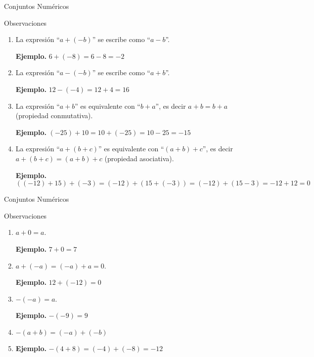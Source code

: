 \documentclass[aspectratio=169,handout,11pt]{beamer}
\begin{document}
	\begin{frame}{Conjuntos Numéricos}
		\begin{block}{Observaciones}
			\begin{enumerate}
				\item La expresión ``$a+(-b)$'' se escribe como ``$a-b$''.
				
				\textbf{Ejemplo.} $6+(-8)=6-8=-2$
				\pause
				
				\item La expresión ``$a-(-b)$'' se escribe como ``$a+b$''.
				
				\textbf{Ejemplo.} $12-(-4)=12+4=16$
				\pause
				
				\item La expresión ``$a+b$'' es equivalente con ``$b+a$'', es decir $a+b=b+a$ (propiedad conmutativa).
				
				\textbf{Ejemplo.} $(-25)+10=10+(-25)=10-25=-15$
				\pause
				
				\item La expresión ``$a+(b+c)$'' es equivalente con ``$(a+b)+c$'', es decir
				$a+(b+c)=(a+b)+c$ (propiedad asociativa).
				
				\textbf{Ejemplo.}
				\[
				((-12)+15)+(-3)=(-12)+(15+(-3))=(-12)+(15-3)=-12+12=0
				\]
			\end{enumerate}
		\end{block}
	\end{frame}
	
	\begin{frame}{Conjuntos Numéricos}
		\begin{block}{Observaciones}
			\begin{enumerate}
				\item $a+0=a$.
				
				\textbf{Ejemplo.} $7+0=7$
				\pause
				
				\item $a+(-a)=(-a)+a=0$.
				
				\textbf{Ejemplo.} $12+(-12)=0$
				\pause
				
				\item $-(-a)=a$.
				
				\textbf{Ejemplo.} $-(-9)=9$
				\pause
				
				\item $-(a+b)=(-a)+(-b)$
				\pause
				
				\item \textbf{Ejemplo.} $-(4+8)=(-4)+(-8)=-12$
			\end{enumerate}
		\end{block}
	\end{frame}
	
\end{document}
